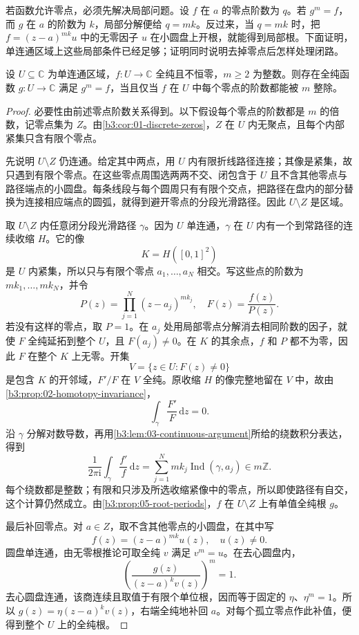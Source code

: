 若函数允许零点，必须先解决局部问题。设 \(f\) 在 \(a\) 的零点阶数为 \(q\)。若 \(g^m=f\)，而 \(g\) 在 \(a\) 的阶数为 \(k\)，局部分解便给 \(q=mk\)。反过来，当 \(q=mk\) 时，把 \(f=(z-a)^{mk}u\) 中的无零因子 \(u\) 在小圆盘上开根，就能得到局部根。下面证明，单连通区域上这些局部条件已经足够；证明同时说明去掉零点后怎样处理闭路。

\begin{proposition}\label{b3:prop:05-roots-with-zeros}
设 \(U\subseteq\mathbb C\) 为单连通区域，\(f:U\to\mathbb C\) 全纯且不恒零，\(m\ge2\) 为整数。则存在全纯函数 \(g:U\to\mathbb C\) 满足 \(g^m=f\)，当且仅当 \(f\) 在 \(U\) 中每个零点的阶数都能被 \(m\) 整除。
\end{proposition}
\begin{proof}
必要性由前述零点阶数关系得到。以下假设每个零点的阶数都是 \(m\) 的倍数，记零点集为 \(Z\)。由\cref{b3:cor:01-discrete-zeros}，\(Z\) 在 \(U\) 内无聚点，且每个内部紧集只含有限个零点。

先说明 \(U\setminus Z\) 仍连通。给定其中两点，用 \(U\) 内有限折线路径连接；其像是紧集，故只遇到有限个零点。在这些零点周围选两两不交、闭包含于 \(U\) 且不含其他零点与路径端点的小圆盘。每条线段与每个圆周只有有限个交点，把路径在盘内的部分替换为连接相应端点的圆弧，就得到避开零点的分段光滑路径。因此 \(U\setminus Z\) 是区域。

取 \(U\setminus Z\) 内任意闭分段光滑路径 \(\gamma\)。因为 \(U\) 单连通，\(\gamma\) 在 \(U\) 内有一个到常路径的连续收缩 \(H\)。它的像
\[
 K=H([0,1]^2)
\]
是 \(U\) 内紧集，所以只与有限个零点 \(a_1,\ldots,a_N\) 相交。写这些点的阶数为 \(mk_1,\ldots,mk_N\)，并令
\[
 P(z)=\prod_{j=1}^N(z-a_j)^{mk_j},\quad F(z)=\frac{f(z)}{P(z)}.
\]
若没有这样的零点，取 \(P=1\)。在 \(a_j\) 处用局部零点分解消去相同阶数的因子，就使 \(F\) 全纯延拓到整个 \(U\)，且 \(F(a_j)\ne0\)。在 \(K\) 的其余点，\(f\) 和 \(P\) 都不为零，因此 \(F\) 在整个 \(K\) 上无零。开集
\[
 V=\{z\in U:F(z)\ne0\}
\]
是包含 \(K\) 的开邻域，\(F'/F\) 在 \(V\) 全纯。原收缩 \(H\) 的像完整地留在 \(V\) 中，故由\cref{b3:prop:02-homotopy-invariance}，
\[
 \int_\gamma\frac{F'}F\,\mathrm{d}z=0.
\]
沿 \(\gamma\) 分解对数导数，再用\cref{b3:lem:03-continuous-argument}所给的绕数积分表达，得到
\[
 \frac1{2\pi\mathrm{i}}\int_\gamma\frac{f'}f\,\mathrm{d}z
 =\sum_{j=1}^N mk_j\operatorname{Ind}(\gamma,a_j)
 \in m\mathbb Z.
\]
每个绕数都是整数；有限和只涉及所选收缩紧像中的零点，所以即使路径有自交，这个计算仍然成立。由\cref{b3:prop:05-root-periods}，\(f\) 在 \(U\setminus Z\) 上有单值全纯根 \(g\)。

最后补回零点。对 \(a\in Z\)，取不含其他零点的小圆盘，在其中写
\[
 f(z)=(z-a)^{mk}u(z),\quad u(z)\ne0.
\]
圆盘单连通，由无零根推论可取全纯 \(v\) 满足 \(v^m=u\)。在去心圆盘内，
\[
 \left(\frac{g(z)}{(z-a)^k v(z)}\right)^m=1.
\]
去心圆盘连通，该商连续且取值于有限个单位根，因而等于固定的 \(\eta\)、\(\eta^m=1\)。所以 \(g(z)=\eta(z-a)^k v(z)\)，右端全纯地补回 \(a\)。对每个孤立零点作此补值，便得到整个 \(U\) 上的全纯根。
\end{proof}

